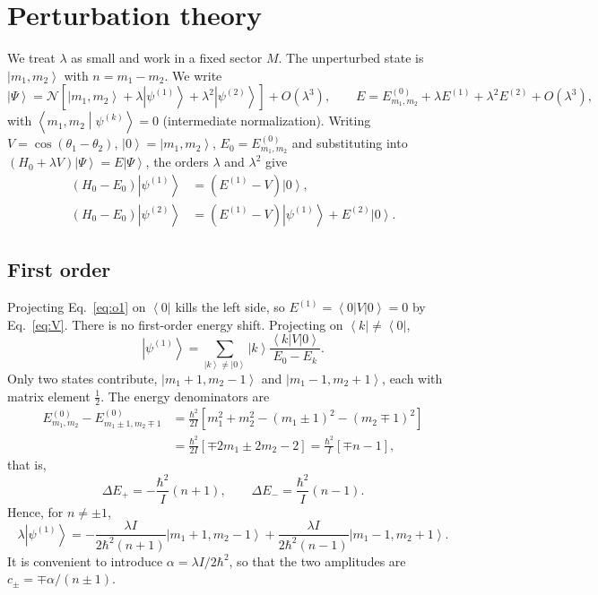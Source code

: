 \documentclass[aps,pra,onecolumn,notitlepage,nofootinbib,11pt]{revtex4-2}
\newcommand{\ket}[1]{\left|#1\right\rangle}
\newcommand{\bra}[1]{\left\langle#1\right|}
\newcommand{\braket}[2]{\left\langle#1\middle|#2\right\rangle}
\begin{document}
\section{Perturbation theory}

We treat $\lambda$ as small and work in a fixed sector $M$. The unperturbed state is
$\ket{m_{1},m_{2}}$ with $n=m_{1}-m_{2}$. We write
\begin{equation}
\ket{\Psi}=\mathcal{N}\left[\ket{m_{1},m_{2}}+\lambda\ket{\psi^{(1)}}+\lambda^{2}
\ket{\psi^{(2)}}\right]+O(\lambda^{3}),\qquad
E=E^{(0)}_{m_{1},m_{2}}+\lambda E^{(1)}+\lambda^{2}E^{(2)}+O(\lambda^{3}),
\label{eq:ptexp}
\end{equation}
with $\braket{m_{1},m_{2}}{\psi^{(k)}}=0$ (intermediate normalization). Writing
$V=\cos(\theta_{1}-\theta_{2})$, $\ket0=\ket{m_{1},m_{2}}$, $E_{0}=E^{(0)}_{m_{1},m_{2}}$
and substituting into $(H_{0}+\lambda V)\ket\Psi=E\ket\Psi$, the orders $\lambda$ and
$\lambda^{2}$ give
\begin{align}
(H_{0}-E_{0})\ket{\psi^{(1)}}&=(E^{(1)}-V)\ket0,\label{eq:o1}\\
(H_{0}-E_{0})\ket{\psi^{(2)}}&=(E^{(1)}-V)\ket{\psi^{(1)}}+E^{(2)}\ket0.\label{eq:o2}
\end{align}

\subsection{First order}

Projecting Eq.~\eqref{eq:o1} on $\bra0$ kills the left side, so
$E^{(1)}=\bra0V\ket0=0$ by Eq.~\eqref{eq:V}. There is no first-order energy shift.
Projecting on $\bra{k}\neq\bra0$,
\begin{equation}
\ket{\psi^{(1)}}=\sum_{\ket k\neq\ket0}\ket k\frac{\bra kV\ket0}{E_{0}-E_{k}} .
\end{equation}
Only two states contribute, $\ket{m_{1}+1,m_{2}-1}$ and $\ket{m_{1}-1,m_{2}+1}$, each with
matrix element $\tfrac12$. The energy denominators are
\begin{align}
E^{(0)}_{m_{1},m_{2}}-E^{(0)}_{m_{1}\pm1,m_{2}\mp1}
&=\frac{\hbar^{2}}{2I}\left[m_{1}^{2}+m_{2}^{2}-(m_{1}\pm1)^{2}-(m_{2}\mp1)^{2}\right]
\nonumber\\
&=\frac{\hbar^{2}}{2I}\left[\mp2m_{1}\pm2m_{2}-2\right]
=\frac{\hbar^{2}}{I}\left[\mp n-1\right],
\end{align}
that is,
\begin{equation}
\Delta E_{+}=-\frac{\hbar^{2}}{I}(n+1),\qquad\Delta E_{-}=\frac{\hbar^{2}}{I}(n-1).
\label{eq:denoms}
\end{equation}
Hence, for $n\neq\pm1$,
\begin{equation}
\lambda\ket{\psi^{(1)}}=-\frac{\lambda I}{2\hbar^{2}(n+1)}\ket{m_{1}+1,m_{2}-1}
+\frac{\lambda I}{2\hbar^{2}(n-1)}\ket{m_{1}-1,m_{2}+1}.
\label{eq:psi1}
\end{equation}
It is convenient to introduce $\alpha=\lambda I/2\hbar^{2}$, so that the two amplitudes
are $c_{\pm}=\mp\alpha/(n\pm1)$.
\end{document}
